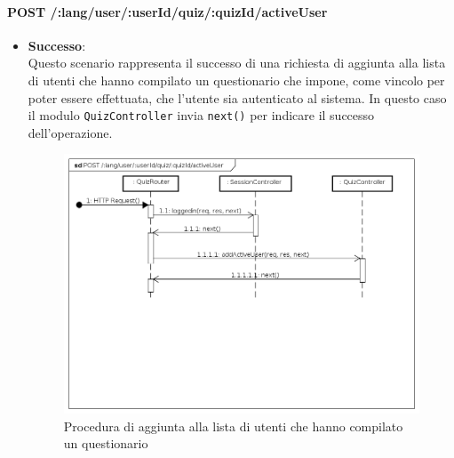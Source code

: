 \paragraph{POST /:lang/user/:userId/quiz/:quizId/activeUser} %
\begin{itemize}
\item \textbf{Successo}:\\
Questo scenario rappresenta il successo di una richiesta di aggiunta alla lista di utenti che hanno compilato un questionario che impone, come vincolo per poter essere effettuata, che l'utente sia autenticato al sistema. In questo caso il modulo \texttt{QuizController} invia \texttt{next()} per indicare il successo dell'operazione.
\label{Procedura di aggiunta alla lista di utenti che hanno compilato un questionario}
\begin{figure}[ht]
	\centering
	\includegraphics[scale=0.40]{UML/DiagrammiDiSequenza/Back-end/POST__lang_user_userId_quiz_quizId_activeUser_success.png}
	\caption{Procedura di aggiunta alla lista di utenti che hanno compilato un questionario}
\end{figure}
\FloatBarrier


\end{itemize}
